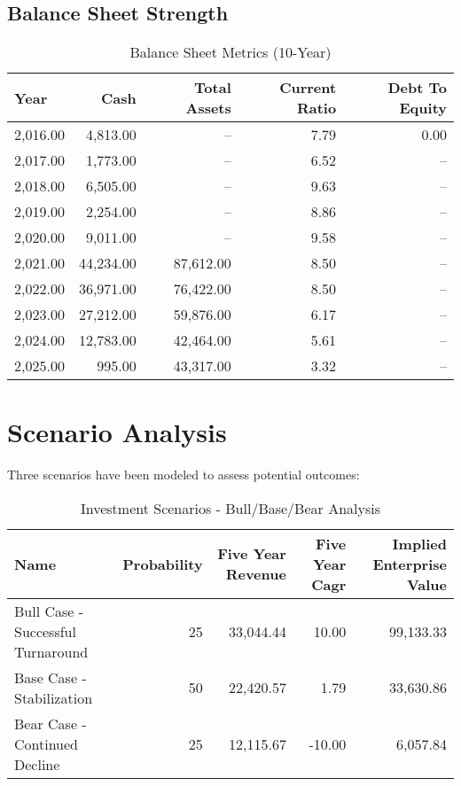 \documentclass[11pt,a4paper]{article}
\begin{document}
\subsection{Balance Sheet Strength}

\begin{table}[htbp]
\centering
\caption{Balance Sheet Metrics (10-Year)}
\label{tab:balance_sheet}
\begin{tabular}{lrrrr}
\toprule
Year & Cash & Total Assets & Current Ratio & Debt To Equity \\
\midrule
2,016.00 & 4,813.00 & -- & 7.79 & 0.00 \\
2,017.00 & 1,773.00 & -- & 6.52 & -- \\
2,018.00 & 6,505.00 & -- & 9.63 & -- \\
2,019.00 & 2,254.00 & -- & 8.86 & -- \\
2,020.00 & 9,011.00 & -- & 9.58 & -- \\
2,021.00 & 44,234.00 & 87,612.00 & 8.50 & -- \\
2,022.00 & 36,971.00 & 76,422.00 & 8.50 & -- \\
2,023.00 & 27,212.00 & 59,876.00 & 6.17 & -- \\
2,024.00 & 12,783.00 & 42,464.00 & 5.61 & -- \\
2,025.00 & 995.00 & 43,317.00 & 3.32 & -- \\
\bottomrule
\end{tabular}
\end{table}

\newpage

\section{Scenario Analysis}

Three scenarios have been modeled to assess potential outcomes:

\begin{table}[htbp]
\centering
\caption{Investment Scenarios - Bull/Base/Bear Analysis}
\label{tab:scenarios}
\begin{tabular}{lrrrr}
\toprule
Name & Probability & Five Year Revenue & Five Year Cagr & Implied Enterprise Value \\
\midrule
Bull Case - Successful Turnaround & 25 & 33,044.44 & 10.00 & 99,133.33 \\
Base Case - Stabilization & 50 & 22,420.57 & 1.79 & 33,630.86 \\
Bear Case - Continued Decline & 25 & 12,115.67 & -10.00 & 6,057.84 \\
\bottomrule
\end{tabular}
\end{table}
\end{document}
